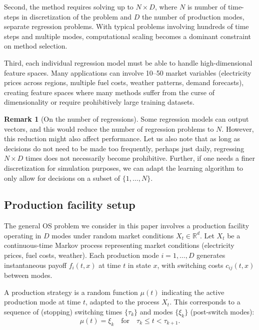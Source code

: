 \documentclass[11pt,reqno,a4paper]{amsart}
\theoremstyle{definition}
\newtheorem{remark}[theorem]{Remark}
\numberwithin{equation}{section}
\DeclareMathOperator{\1}{\mathbbm{1}}
\begin{document}
Second, the method requires solving up to $N \times D$, where $N$ is number of time-steps in discretization of the problem and $D$ the number of production modes, separate regression problems. With typical problems involving hundreds of time steps and multiple modes, computational scaling becomes a dominant constraint on method selection.

Third, each individual regression model must be able to handle high-dimensional feature spaces. Many applications can involve 10--50 market variables (electricity prices across regions, multiple fuel costs, weather patterns, demand forecasts), creating feature spaces where many methods suffer from the curse of dimensionality or require prohibitively large training datasets.

\begin{remark}[On the number of regressions]
  Some regression models can output vectors, and this would reduce the number of regression problems to $N$. However, this reduction might also affect performance. Let us also note that as long as decisions do not need to be made too frequently, perhaps just daily, regressing $N \times D$ times does not necessarily become prohibitive. Further, if one needs a finer discretization for simulation purposes, we can adapt the learning algorithm to only allow for decisions on a subset of $\{1,\dots,N\}$. 
\end{remark}


\subsection{Production facility setup}
The general OS problem we consider in this paper involves a production facility operating in $D$ modes under random market conditions $X_t \in \mathbb{R}^d$. Let $X_t$ be a continuous-time Markov process representing market conditions (electricity prices, fuel costs, weather). Each production mode $i = 1,\ldots,D$ generates instantaneous payoff $f_i(t,x)$ at time $t$ in state $x$, with switching costs $c_{ij}(t,x)$ between modes.

A production strategy is a random function $\mu(t)$ indicating the active production mode at time $t$, adapted to the process $X_t$. This corresponds to a sequence of (stopping) switching times $\{\tau_k\}$ and modes $\{\xi_k\}$ (post-switch modes):
\begin{equation}
  \mu(t) = \xi_k \quad \text{for} \quad \tau_k \leq t < \tau_{k+1}.
\end{equation}
\end{document}
